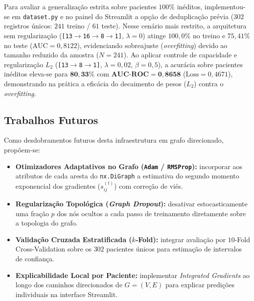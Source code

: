 Para avaliar a generalização estrita sobre pacientes $100\%$ inéditos, implementou-se em \texttt{dataset.py} e no painel do Streamlit a opção de deduplicação prévia ($302$ registros únicos: $241$ treino / $61$ teste). Nesse cenário mais restrito, a arquitetura sem regularização (\texttt{[13$\to$16$\to$8$\to$1]}, $\lambda=0$) atinge $100{,}0\%$ no treino e $75{,}41\%$ no teste ($\text{AUC}=0{,}8122$), evidenciando sobreajuste (\textit{overfitting}) devido ao tamanho reduzido da amostra ($N=241$). Ao aplicar controle de capacidade e regularização $L_2$ (\texttt{[13$\to$8$\to$1]}, $\lambda=0{,}02$, $\beta=0{,}5$), a acurácia sobre pacientes inéditos eleva-se para $\mathbf{80{,}33\%}$ com $\textbf{AUC-ROC} = \mathbf{0{,}8658}$ ($\text{Loss} = 0{,}4671$), demonstrando na prática a eficácia do decaimento de pesos ($L_2$) contra o \textit{overfitting}.

\subsection{Trabalhos Futuros}
Como desdobramentos futuros desta infraestrutura em grafo direcionado, propõem-se:
\begin{itemize}
    \item \textbf{Otimizadores Adaptativos no Grafo (\texttt{Adam} / \texttt{RMSProp}):} incorporar aos atributos de cada aresta do \texttt{nx.DiGraph} a estimativa do segundo momento exponencial dos gradientes ($s_{ij}^{(t)}$) com correção de viés.
    \item \textbf{Regularização Topológica (\textit{Graph Dropout}):} desativar estocasticamente uma fração $p$ dos nós ocultos a cada passo de treinamento diretamente sobre a topologia do grafo.
    \item \textbf{Validação Cruzada Estratificada ($k$-Fold):} integrar avaliação por $10$-Fold Cross-Validation sobre os $302$ pacientes únicos para estimação de intervalos de confiança.
    \item \textbf{Explicabilidade Local por Paciente:} implementar \textit{Integrated Gradients} ao longo dos caminhos direcionados de $G=(V,E)$ para explicar predições individuais na interface Streamlit.
\end{itemize}
